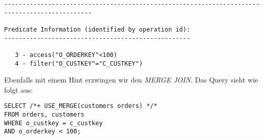\documentclass[11pt,a4paper,parskip=half]{scrartcl}
\begin{document}
\begin{lstlisting}
----------------------------------------------------------------------------------------------                                                                                                                                                                                                               
                                                                                                                                                                                                                                                                                                             
Predicate Information (identified by operation id):                                                                                                                                                                                                                                                          
---------------------------------------------------                                                                                                                                                                                                                                                          
                                                                                                                                                                                                                                                                                                             
   3 - access("O_ORDERKEY"<100)                                                                                                                                                                                                                                                                              
   4 - filter("O_CUSTKEY"="C_CUSTKEY")                                                                                                                                                                                                                                                                       
\end{lstlisting}

Ebenfalls mit einem Hint erzwingen wir den \emph{MERGE JOIN}. Das Query sieht wie folgt aus:
\begin{lstlisting}
SELECT /*+ USE_MERGE(customers orders) */*
FROM orders, customers
WHERE o_custkey = c_custkey
AND o_orderkey < 100;
\end{lstlisting}
\end{document}
